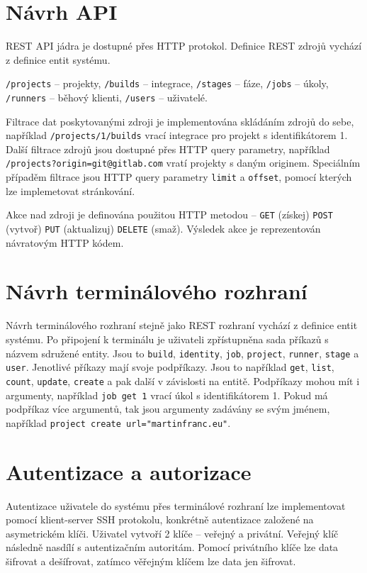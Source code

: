 \section{Návrh API}

REST API jádra je dostupné přes HTTP protokol.
Definice REST zdrojů vychází z definice entit systému.

\verb|/projects| -- projekty,
\verb|/builds| -- integrace,
\verb|/stages| -- fáze,
\verb|/jobs| -- úkoly,
\verb|/runners| -- běhový klienti,
\verb|/users| -- uživatelé.

Filtrace dat poskytovanými zdroji je implementována skládáním zdrojů do sebe, například \verb|/projects/1/builds| vrací integrace pro projekt s identifikátorem 1.
Další filtrace zdrojů jsou dostupné přes HTTP query parametry, například \verb|/projects?origin=git@gitlab.com| vratí projekty s daným originem.
Speciálním případěm filtrace jsou HTTP query parametry \verb|limit| a \verb|offset|, pomocí kterých lze implemetovat stránkování.

Akce nad zdroji je definována použitou HTTP metodou -- \verb|GET| (získej) \verb|POST| (vytvoř) \verb|PUT| (aktualizuj) \verb|DELETE| (smaž).
Výsledek akce je reprezentován návratovým HTTP kódem.

\section{Návrh terminálového rozhraní}

Návrh terminálového rozhraní stejně jako REST rozhraní vychází z definice entit systému.
Po připojení k terminálu je uživateli zpřístupněna sada příkazů s názvem sdružené entity.
Jsou to \verb|build|, \verb|identity|, \verb|job|, \verb|project|, \verb|runner|, \verb|stage| a \verb|user|.
Jenotlivé příkazy mají svoje podpříkazy.
Jsou to například \verb|get|, \verb|list|, \verb|count|, \verb|update|, \verb|create| a pak další v závislosti na entitě.
Podpříkazy mohou mít i argumenty, například \verb|job get 1| vrací úkol s identifikátorem 1.
Pokud má podpříkaz více argumentů, tak jsou argumenty zadávány se svým jménem, například \verb|project create url="martinfranc.eu"|.

\section{Autentizace a autorizace}

Autentizace uživatele do systému přes terminálové rozhraní lze implementovat pomocí klient-server SSH protokolu, konkrétně autentizace založené na asymetrickém klíči.
Uživatel vytvoří 2 klíče -- veřejný a privátní.
Veřejný klíč následně nasdílí s autentizačním autoritám.
Pomocí privátního klíče lze data šifrovat a dešífrovat, zatímco věřejným klíčem lze data jen šifrovat.

